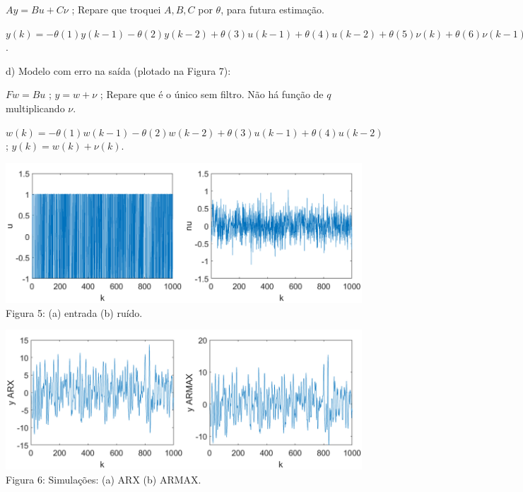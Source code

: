 \documentclass{rbfin}
\begin{document}
$Ay = Bu + C \nu$ ; Repare que troquei $A, B, C$ por $\theta$, para futura estimação.

$y(k) = - \theta(1) y(k-1) - \theta(2) y(k-2) + \theta(3) u(k - 1) + \theta(4) u(k - 2) + \theta(5) \nu(k) + \theta(6) \nu(k - 1)$.

d) Modelo com erro na saída (plotado na Figura 7):

$Fw = Bu$ ; $y = w + \nu$ ; Repare que é o único sem filtro. Não há função de $q$ multiplicando $\nu$.

$w(k) = - \theta(1) w(k-1) - \theta(2) w(k-2) + \theta(3) u(k - 1) + \theta(4) u(k - 2)$ ; $y(k) = w(k) + \nu(k)$.

\begin{center}
\includegraphics[scale=0.65]{5a}
Figura 5: (a) entrada (b) ruído.
\end{center}

\begin{center}
\includegraphics[scale=0.65]{6a}
Figura 6: Simulações: (a) ARX (b) ARMAX.
\end{center}

\newpage
\end{document}
